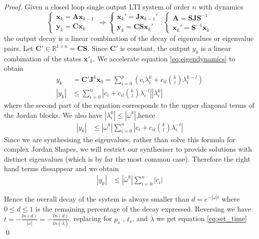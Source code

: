 \documentclass[sigconf]{llncs}
\newcommand{\mat}[1]{\boldsymbol{#1}}
\renewcommand{\vec}[1]{\boldsymbol{#1}}
\begin{document}
\begin{proof}
Given a closed loop single output LTI system of order $n$ with dynamics
\begin{equation}
\left\{\begin{array}{c}\vec{x}_k=\mat{A}\vec{x}_{k-1}\\ \vec{y}_k=\mat{C}\vec{x}_k\end{array}\right. \Rightarrow \left\{ \begin{array}{c}\vec{x}_k'=\mat{J}\vec{x}_{k-1}'\\ \vec{y}_k=\mat{C}\mat{S}\vec{x}_k'\end{array}\right. : \left\{ \begin{array}{c}\mat{A}=\mat{S}\mat{J}\mat{S}^{-1} \\ \vec{x}_k'=\mat{S}^{-1}\vec{x}_k\end{array}\right.
\label{eq:eigendynamics}
\end{equation}
%
the output decay is a linear combination of the decay of eigenvalues or
eigenvalue pairs.  Let $\mat{C}'\in \mathbb{R}^{1 \times n}=\mat{C}\mat{S}$. 
Since $\mat{C}'$ is constant, the output $y_k$ is a linear combination of
the states $\vec{x}'_k$.  We accelerate equation \eqref{eq:eigendynamics} to
obtain
%
\begin{align}
y_k&=\mat{C}'\mat{J}^k\vec{x}_0 = \sum_{i=0}^p \left( c_i \lambda_i^k + c_{il}\binom{k}{l} \lambda_i^{k-l}\right)\\
|y_k|&\leq \sum_{i=0}^n \left|c_i + c_{il}\binom{k}{l} \lambda_i^{-l}\right||\lambda_i^k|
\end{align}
%
where the second  part of the equation corresponds to the upper diagonal
terms of the Jordan blocks.  We also have $|\lambda_i^k|\leq
|\overline{\omega}^k|$,hence
%
\begin{align}
|y_k|&\leq |\overline{\omega}^k|\sum_{i=0}^n \left|c_i + c_{il}\binom{k}{l} \lambda_i^{-l}\right|
\end{align}
%
Since we are synthesising the eigenvalues, rather than solve this formula
for complex Jordan Shapes, we will restrict our synthesiser to provide
solutions with distinct eigenvalues (which is by far the most common case). 
Therefore the right hand terms dissappear and we obtain
%
\begin{align}
|y_k|&\leq |\overline{\omega}^k|\sum_{i=0}^n |c_i|
\end{align}

Hence the overall decay of the system is always smaller
than $d=e^{-|\overline{\omega}| t}$ where $0\leq d\leq 1$ is the remaining
percentage of the decay expressed.  Reversing we have
$t=-\frac{ln(d)}{|\overline{\omega}|}=-\frac{ln(d)}{ln(\overline{\lambda})}$. 
replacing for $p_s$ , $t_s$, and $\overline{\lambda}$ we get equation
\eqref{eq:set_time}
%
\qed
\end{proof}
\end{document}

